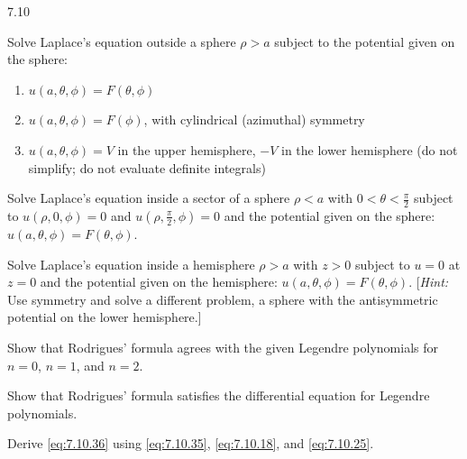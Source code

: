 \begin{exercises}{7.10}
\item Solve Laplace's equation outside a sphere $\rho > a$ subject to the potential given on the sphere:
\begin{enumerate}
\item[(a)] $u(a,\theta,\phi) = F(\theta,\phi)$
\item[(b)] $u(a,\theta,\phi) = F(\phi)$, with cylindrical (azimuthal) symmetry
\item[(c)] $u(a,\theta,\phi) = V$ in the upper hemisphere, $-V$ in the lower hemisphere (do not simplify; do not evaluate definite integrals)
\end{enumerate}

\item Solve Laplace's equation inside a sector of a sphere $\rho < a$ with $0 < \theta < \frac{\pi}{2}$ subject to $u(\rho,0,\phi) = 0$ and $u(\rho,\frac{\pi}{2},\phi) = 0$ and the potential given on the sphere: $u(a,\theta,\phi) = F(\theta,\phi)$.

\item Solve Laplace's equation inside a hemisphere $\rho > a$ with $z > 0$ subject to $u = 0$ at $z = 0$ and the potential given on the hemisphere: $u(a,\theta,\phi) = F(\theta,\phi)$.  [\emph{Hint:} Use symmetry and solve a different problem, a sphere with the antisymmetric potential on the lower hemisphere.]

\item Show that Rodrigues' formula agrees with the given Legendre polynomials for $n = 0$, $n = 1$, and $n = 2$.

\item Show that Rodrigues' formula satisfies the differential equation for Legendre polynomials.

\item Derive \eqref{eq:7.10.36} using \eqref{eq:7.10.35}, \eqref{eq:7.10.18}, and \eqref{eq:7.10.25}.

\end{exercises}
